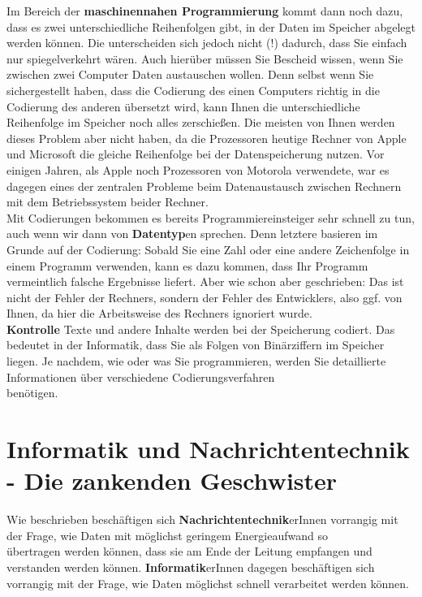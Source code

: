 Im Bereich der \textbf{maschinennahen Programmierung} kommt dann noch dazu, dass es zwei unterschiedliche Reihenfolgen gibt, in der Daten im Speicher abgelegt werden können. Die unterscheiden sich jedoch nicht (!) dadurch, dass Sie einfach nur spiegelverkehrt wären. Auch hierüber müssen Sie Bescheid wissen, wenn Sie zwischen zwei Computer Daten austauschen wollen. Denn selbst wenn Sie sichergestellt haben, dass die Codierung des einen Computers richtig in die Codierung des anderen übersetzt wird, kann Ihnen die unterschiedliche Reihenfolge im Speicher noch alles zerschießen. Die meisten von Ihnen werden dieses Problem aber nicht haben, da die Prozessoren heutige Rechner von Apple und Microsoft die gleiche Reihenfolge bei der Datenspeicherung nutzen. Vor einigen Jahren, als Apple noch Prozessoren von Motorola verwendete, war es dagegen eines der zentralen Probleme beim Datenaustausch zwischen Rechnern mit dem Betriebssystem beider Rechner.\\

Mit Codierungen bekommen es bereits Programmiereinsteiger sehr schnell zu tun, auch wenn wir dann von \textbf{Datentyp}en sprechen. Denn letztere basieren im Grunde auf der Codierung: Sobald Sie eine Zahl oder eine andere Zeichenfolge in einem Programm verwenden, kann es dazu kommen, dass Ihr Programm vermeintlich falsche Ergebnisse liefert. Aber wie schon aber geschrieben: Das ist nicht der Fehler der Rechners, sondern der Fehler des Entwicklers, also ggf. von Ihnen, da hier die Arbeitsweise des Rechners ignoriert wurde. \\

\textbf{Kontrolle}
Texte und andere Inhalte werden bei der Speicherung codiert. Das bedeutet in der Informatik, dass Sie als Folgen von Binärziffern im Speicher liegen. Je nachdem, wie oder was Sie programmieren, werden Sie detaillierte Informationen über verschiedene Codierungsverfahren\\ benötigen.

\section{Informatik und Nachrichtentechnik - Die zankenden Geschwister}

Wie beschrieben beschäftigen sich \textbf{Nachrichtentechnik}erInnen vorrangig mit der Frage, wie Daten mit möglichst geringem Energieaufwand so\\ übertragen werden können, dass sie am Ende der Leitung empfangen und verstanden werden können. \textbf{Informatik}erInnen dagegen beschäftigen sich vorrangig mit der Frage, wie Daten möglichst schnell verarbeitet werden können.\\

